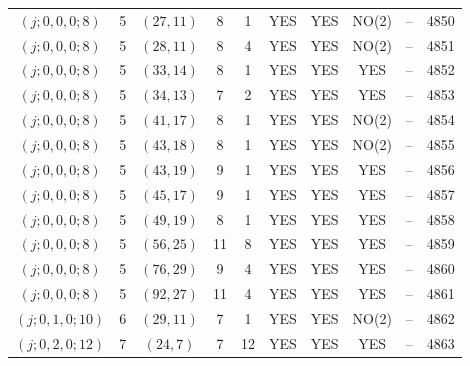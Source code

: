 \begin{longtable}{|c|c|c|c|c|c|c|c|c|c|}
$(j; 0, 0, 0; 8)$ & 5 & $(27, 11)$ & 8 & 1 & YES & YES & NO(2) & -- & 4850\\
$(j; 0, 0, 0; 8)$ & 5 & $(28, 11)$ & 8 & 4 & YES & YES & NO(2) & -- & 4851\\
$(j; 0, 0, 0; 8)$ & 5 & $(33, 14)$ & 8 & 1 & YES & YES & YES & -- & 4852\\
$(j; 0, 0, 0; 8)$ & 5 & $(34, 13)$ & 7 & 2 & YES & YES & YES & -- & 4853\\
$(j; 0, 0, 0; 8)$ & 5 & $(41, 17)$ & 8 & 1 & YES & YES & NO(2) & -- & 4854\\
$(j; 0, 0, 0; 8)$ & 5 & $(43, 18)$ & 8 & 1 & YES & YES & NO(2) & -- & 4855\\
$(j; 0, 0, 0; 8)$ & 5 & $(43, 19)$ & 9 & 1 & YES & YES & YES & -- & 4856\\
$(j; 0, 0, 0; 8)$ & 5 & $(45, 17)$ & 9 & 1 & YES & YES & YES & -- & 4857\\
$(j; 0, 0, 0; 8)$ & 5 & $(49, 19)$ & 8 & 1 & YES & YES & YES & -- & 4858\\
$(j; 0, 0, 0; 8)$ & 5 & $(56, 25)$ & 11 & 8 & YES & YES & YES & -- & 4859\\
$(j; 0, 0, 0; 8)$ & 5 & $(76, 29)$ & 9 & 4 & YES & YES & YES & -- & 4860\\
$(j; 0, 0, 0; 8)$ & 5 & $(92, 27)$ & 11 & 4 & YES & YES & YES & -- & 4861\\
$(j; 0, 1, 0; 10)$ & 6 & $(29, 11)$ & 7 & 1 & YES & YES & NO(2) & -- & 4862\\
$(j; 0, 2, 0; 12)$ & 7 & $(24, 7)$ & 7 & 12 & YES & YES & YES & -- & 4863
\end{longtable}
